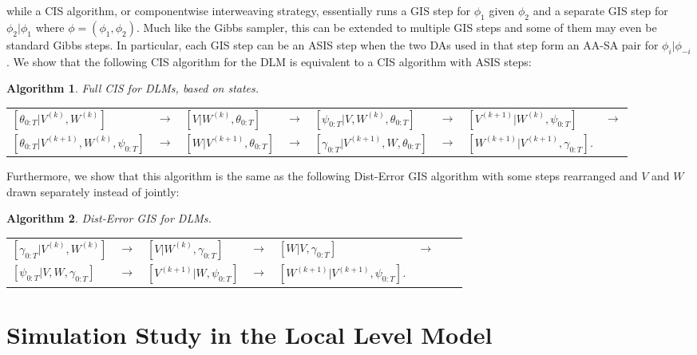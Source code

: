 \documentclass{article}\usepackage[]{graphicx}\usepackage[]{color}
\newtheorem{alg}{Algorithm}
\begin{document}
while a CIS algorithm, or componentwise interweaving strategy, essentially runs a GIS step for $\phi_1$ given $\phi_2$ and a separate GIS step for $\phi_2|\phi_1$ where $\phi=(\phi_1,\phi_2)$. Much like the Gibbs sampler, this can be extended to multiple GIS steps and some of them may even be standard Gibbs steps. In particular, each GIS step can be an ASIS step when the two DAs used in that step form an AA-SA pair for $\phi_i|\phi_{-i}$. We show that the following CIS algorithm for the DLM is equivalent to a CIS algorithm with ASIS steps:
\begin{alg}Full CIS for DLMs, based on states.\label{alg:FCIS2}\\
  \begin{center}
    \begin{tabular}{llllllll}
      $[\theta_{0:T}|V^{(k)},W^{(k)}]$& $\to $& $[V|W^{(k)},\theta_{0:T}]$& $\to$& $[\psi_{0:T}|V,W^{(k)},\theta_{0:T}]$& $\to$& $[V^{(k+1)}|W^{(k)},\psi_{0:T}]$& $\to$\\
      $[\theta_{0:T}|V^{(k+1)},W^{(k)},\psi_{0:T}]$& $\to$& $[W|V^{(k+1)},\theta_{0:T}]$& $\to$& $[\gamma_{0:T}|V^{(k+1)},W,\theta_{0:T}]$& $\to$& $[W^{(k+1)}|V^{(k+1)},\gamma_{0:T}]$.
    \end{tabular}
  \end{center}
\end{alg}
Furthermore, we show that this algorithm is the same as the following Dist-Error GIS algorithm with some steps rearranged and $V$ and $W$ drawn separately instead of jointly:
\begin{alg}Dist-Error GIS for DLMs.\label{alg:Dist-Error}\\
  \begin{center}
    \begin{tabular}{llllllll}
      $[\gamma_{0:T}|V^{(k)},W^{(k)}]$& $\to $& $[V|W^{(k)},\gamma_{0:T}]$& $\to$& $[W|V,\gamma_{0:T}]$& $\to$\\
      $[\psi_{0:T}|V,W,\gamma_{0:T}]$& $\to$& $[V^{(k+1)}|W,\psi_{0:T}]$& $\to$& $[W^{(k+1)}|V^{(k+1)},\psi_{0:T}]$.&
    \end{tabular}
  \end{center}
\end{alg}

\section{Simulation Study in the Local Level Model}
\end{document}
